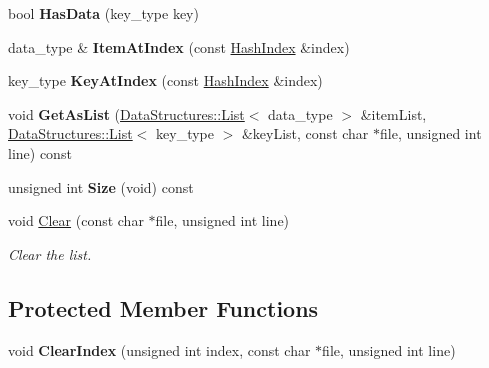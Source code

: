 \begin{DoxyCompactItemize}
\item 
\hypertarget{class_data_structures_1_1_hash_a3bb700c55560bd2425ba39592cb22680}{bool {\bfseries Has\-Data} (key\-\_\-type key)}\label{class_data_structures_1_1_hash_a3bb700c55560bd2425ba39592cb22680}

\item 
\hypertarget{class_data_structures_1_1_hash_a5fec5e2f5f479ddeebefe9a0ff1c50e4}{data\-\_\-type \& {\bfseries Item\-At\-Index} (const \hyperlink{struct_data_structures_1_1_hash_index}{Hash\-Index} \&index)}\label{class_data_structures_1_1_hash_a5fec5e2f5f479ddeebefe9a0ff1c50e4}

\item 
\hypertarget{class_data_structures_1_1_hash_a95b38ece64c4c08d6c3da13ef935cf36}{key\-\_\-type {\bfseries Key\-At\-Index} (const \hyperlink{struct_data_structures_1_1_hash_index}{Hash\-Index} \&index)}\label{class_data_structures_1_1_hash_a95b38ece64c4c08d6c3da13ef935cf36}

\item 
\hypertarget{class_data_structures_1_1_hash_a10d4e81e8087d55073e34c0677f569f0}{void {\bfseries Get\-As\-List} (\hyperlink{class_data_structures_1_1_list}{Data\-Structures\-::\-List}$<$ data\-\_\-type $>$ \&item\-List, \hyperlink{class_data_structures_1_1_list}{Data\-Structures\-::\-List}$<$ key\-\_\-type $>$ \&key\-List, const char $\ast$file, unsigned int line) const }\label{class_data_structures_1_1_hash_a10d4e81e8087d55073e34c0677f569f0}

\item 
\hypertarget{class_data_structures_1_1_hash_aaad5a7c4c75754deb25473eb9e0bc1f7}{unsigned int {\bfseries Size} (void) const }\label{class_data_structures_1_1_hash_aaad5a7c4c75754deb25473eb9e0bc1f7}

\item 
\hypertarget{class_data_structures_1_1_hash_adcbf7b437513650734419bd55f736276}{void \hyperlink{class_data_structures_1_1_hash_adcbf7b437513650734419bd55f736276}{Clear} (const char $\ast$file, unsigned int line)}\label{class_data_structures_1_1_hash_adcbf7b437513650734419bd55f736276}

\begin{DoxyCompactList}\small\item\em Clear the list. \end{DoxyCompactList}\end{DoxyCompactItemize}
\subsection*{Protected Member Functions}
\begin{DoxyCompactItemize}
\item 
\hypertarget{class_data_structures_1_1_hash_aced041b148703447bb2ff62ee0a64df7}{void {\bfseries Clear\-Index} (unsigned int index, const char $\ast$file, unsigned int line)}\label{class_data_structures_1_1_hash_aced041b148703447bb2ff62ee0a64df7}

\end{DoxyCompactItemize}
